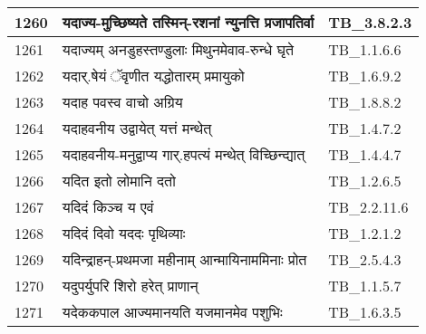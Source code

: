 \documentclass[17pt]{extarticle}
\begin{document}
\begin{longtable}{||p{0.4in}||p{4.9in}||p{0.9in}||}
    \hline
        
    1260 & यदाज्य{-}मुच्छिष्यते तस्मिन्{-}रशनां न्युनत्ति प्रजापतिर्वा & TB\_3.8.2.3       \\
    
    \hline
        
    1261 & यदाज्यम् अनडुहस्तण्डुलाः मिथुनमेवाव{-}रुन्धे घृते & TB\_1.1.6.6       \\
    
    \hline
        
    1262 & यदार्.षेयं ॅवृणीत यद्धोतारम् प्रमायुको & TB\_1.6.9.2       \\
    
    \hline
        
    1263 & यदाह पवस्व वाचो अग्रिय & TB\_1.8.8.2       \\
    
    \hline
        
    1264 & यदाहवनीय उद्वायेत् यत्तं मन्थेत् & TB\_1.4.7.2       \\
    
    \hline
        
    1265 & यदाहवनीय{-}मनुद्वाप्य गार्.हपत्यं मन्थेत् विच्छिन्द्यात् & TB\_1.4.4.7       \\
    
    \hline
        
    1266 & यदित इतो लोमानि दतो & TB\_1.2.6.5       \\
    
    \hline
        
    1267 & यदिदं किञ्च य एवं & TB\_2.2.11.6       \\
    
    \hline
        
    1268 & यदिदं दिवो यददः पृथिव्याः & TB\_1.2.1.2       \\
    
    \hline
        
    1269 & यदिन्द्राहन्{-}प्रथमजा महीनाम् आन्मायिनाममिनाः प्रोत & TB\_2.5.4.3       \\
    
    \hline
        
    1270 & यदुपर्युपरि शिरो हरेत् प्राणान् & TB\_1.1.5.7       \\
    
    \hline
        
    1271 & यदेककपाल आज्यमानयति यजमानमेव पशुभिः & TB\_1.6.3.5       \\
    
    \hline
        

\end{longtable}
\end{document}
